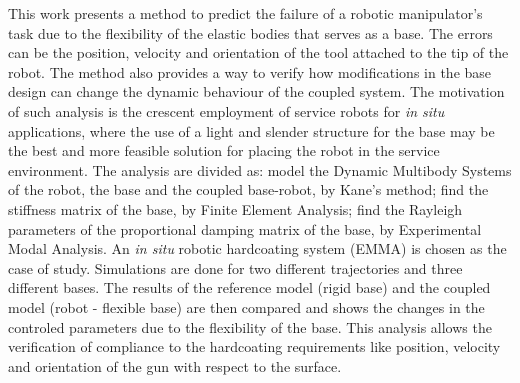 \begin{foreignabstract}
		
This work presents a method to predict the failure of a robotic manipulator's
task due to the flexibility of the elastic bodies that serves as a base. The
errors can be the position, velocity and orientation of the tool attached to the
tip of the robot. The method also provides a way to verify how modifications in
the base design can change the dynamic behaviour of the coupled system.
The motivation of such analysis is the crescent employment of service robots for
\textit{in situ} applications, where the use of a light and slender structure
for the base may be the best and more feasible solution for placing the robot in
the service environment. The analysis are divided as: model the Dynamic
Multibody Systems of the robot, the base and the coupled base-robot, by Kane's
method; find the stiffness matrix of the base, by Finite Element Analysis; find
the Rayleigh parameters of the proportional damping matrix of the base, by
Experimental Modal Analysis.
An \textit{in situ} robotic hardcoating system (EMMA) is chosen as the case of
study. Simulations are done for two different trajectories and three different
bases. The results of the reference model (rigid base) and the coupled model
(robot - flexible base) are then compared and shows the changes in the controled
parameters due to the flexibility of the base. This analysis allows the
verification of compliance to the hardcoating requirements like position,
velocity and orientation of the gun with respect to the surface.

\end{foreignabstract}

